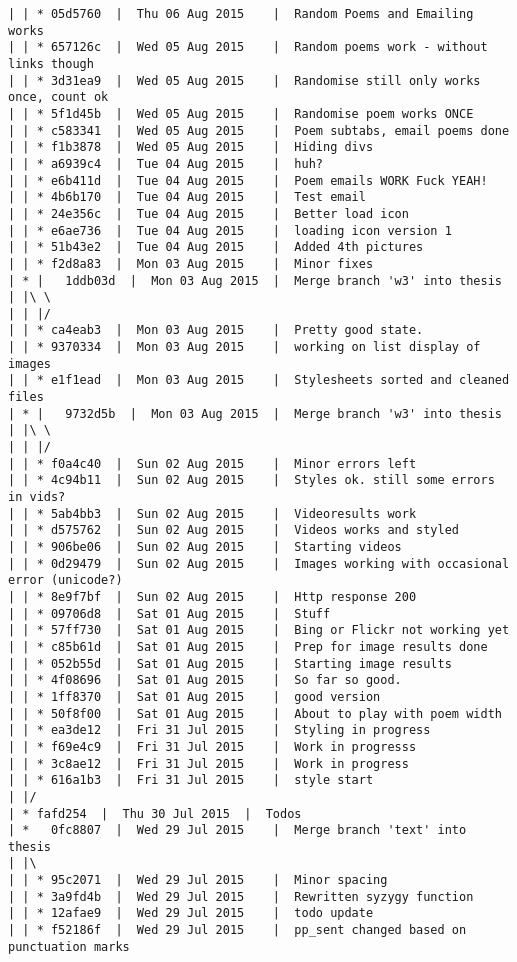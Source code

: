 \begin{verbatim}
| | * 05d5760  |  Thu 06 Aug 2015	 |  Random Poems and Emailing works
| | * 657126c  |  Wed 05 Aug 2015	 |  Random poems work - without links though
| | * 3d31ea9  |  Wed 05 Aug 2015	 |  Randomise still only works once, count ok
| | * 5f1d45b  |  Wed 05 Aug 2015	 |  Randomise poem works ONCE
| | * c583341  |  Wed 05 Aug 2015	 |  Poem subtabs, email poems done
| | * f1b3878  |  Wed 05 Aug 2015	 |  Hiding divs
| | * a6939c4  |  Tue 04 Aug 2015	 |  huh?
| | * e6b411d  |  Tue 04 Aug 2015	 |  Poem emails WORK Fuck YEAH!
| | * 4b6b170  |  Tue 04 Aug 2015	 |  Test email
| | * 24e356c  |  Tue 04 Aug 2015	 |  Better load icon
| | * e6ae736  |  Tue 04 Aug 2015	 |  loading icon version 1
| | * 51b43e2  |  Tue 04 Aug 2015	 |  Added 4th pictures
| | * f2d8a83  |  Mon 03 Aug 2015	 |  Minor fixes
| * |   1ddb03d  |  Mon 03 Aug 2015	 |  Merge branch 'w3' into thesis
| |\ \  
| | |/  
| | * ca4eab3  |  Mon 03 Aug 2015	 |  Pretty good state.
| | * 9370334  |  Mon 03 Aug 2015	 |  working on list display of images
| | * e1f1ead  |  Mon 03 Aug 2015	 |  Stylesheets sorted and cleaned files
| * |   9732d5b  |  Mon 03 Aug 2015	 |  Merge branch 'w3' into thesis
| |\ \  
| | |/  
| | * f0a4c40  |  Sun 02 Aug 2015	 |  Minor errors left
| | * 4c94b11  |  Sun 02 Aug 2015	 |  Styles ok. still some errors in vids?
| | * 5ab4bb3  |  Sun 02 Aug 2015	 |  Videoresults work
| | * d575762  |  Sun 02 Aug 2015	 |  Videos works and styled
| | * 906be06  |  Sun 02 Aug 2015	 |  Starting videos
| | * 0d29479  |  Sun 02 Aug 2015	 |  Images working with occasional error (unicode?)
| | * 8e9f7bf  |  Sun 02 Aug 2015	 |  Http response 200
| | * 09706d8  |  Sat 01 Aug 2015	 |  Stuff
| | * 57ff730  |  Sat 01 Aug 2015	 |  Bing or Flickr not working yet
| | * c85b61d  |  Sat 01 Aug 2015	 |  Prep for image results done
| | * 052b55d  |  Sat 01 Aug 2015	 |  Starting image results
| | * 4f08696  |  Sat 01 Aug 2015	 |  So far so good.
| | * 1ff8370  |  Sat 01 Aug 2015	 |  good version
| | * 50f8f00  |  Sat 01 Aug 2015	 |  About to play with poem width
| | * ea3de12  |  Fri 31 Jul 2015	 |  Styling in progress
| | * f69e4c9  |  Fri 31 Jul 2015	 |  Work in progresss
| | * 3c8ae12  |  Fri 31 Jul 2015	 |  Work in progress
| | * 616a1b3  |  Fri 31 Jul 2015	 |  style start
| |/  
| * fafd254  |  Thu 30 Jul 2015	 |  Todos
| *   0fc8807  |  Wed 29 Jul 2015	 |  Merge branch 'text' into thesis
| |\  
| | * 95c2071  |  Wed 29 Jul 2015	 |  Minor spacing
| | * 3a9fd4b  |  Wed 29 Jul 2015	 |  Rewritten syzygy function
| | * 12afae9  |  Wed 29 Jul 2015	 |  todo update
| | * f52186f  |  Wed 29 Jul 2015	 |  pp_sent changed based on punctuation marks

\end{verbatim}
